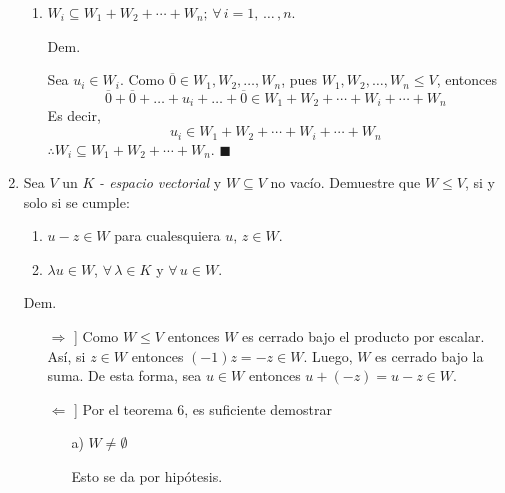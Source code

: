 \documentclass[fleqn]{article}                       %
\begin{document}
\begin{enumerate}
\begin{enumerate}
            \item $ W_i \subseteq W_1 + W_2 + \cdots + W_n; \, \forall \, i = 1,  \, \ldots \, , n $. \par
            \hspace{2.7mm}  Dem. \par

            Sea $ u_i \in W_i $. Como $ \overline{0} \in W_1, W_2, \ldots, W_n $, pues $ W_1, W_2, \ldots, W_n \leq V $, entonces
            \begin{equation*}
                \overline{0} + \overline{0} + \ldots + u_i + \ldots + \overline{0} \in W_1 + W_2 + \cdots + W_i + \cdots + W_n
            \end{equation*}
            Es decir,
            \begin{equation*}
                u_i \in W_1 + W_2 + \cdots + W_i + \cdots + W_n
            \end{equation*}
            $ \therefore W_i \subseteq W_1 + W_2 + \cdots + W_n $. $ \blacksquare $
        \end{enumerate}
        
        \item Sea $ V $ un $ K $ \textsl{- espacio vectorial} y $ W \subseteq V $ no vacío. Demuestre que $ W \leq V $, si y solo si se cumple:
        
        \begin{enumerate}
            \item $ u - z \in W $ para cualesquiera $ u, \, z \in W $.
            
            \item $ \lambda u \in W $, $ \forall \, \lambda \in K $ y $ \forall \, u \in W $.
        \end{enumerate}
        \hspace{2.7mm}  Dem. \par
        \begin{enumerate}
            \item[$ \Longrightarrow $]] Como $ W \leq V $ entonces $ W $ es cerrado bajo el producto por escalar. Así, si $ z\in W $ entonces $ (-1)z = -z \in W $. Luego, $ W $ es cerrado bajo la suma. De esta forma, sea $ u \in W $ entonces $ u + (-z) = u - z \in W $. \par
            \item[$ \Longleftarrow $]] Por el teorema 6, es suficiente demostrar
            \begin{enumerate}
                \item[a)] $ W \neq \emptyset $ \par
                Esto se da por hipótesis.


\end{enumerate}
\end{enumerate}
\end{enumerate}
\end{document}
